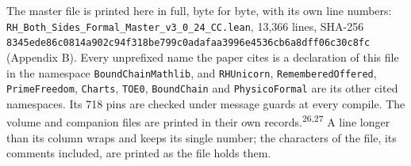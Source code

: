 \documentclass[10pt]{article}
\begin{document}
The master file is printed here in full, byte for byte, with its own
line numbers:
\texttt{RH\_\allowbreak{}Both\_\allowbreak{}Sides\_\allowbreak{}Formal\_\allowbreak{}Master\_\allowbreak{}v3\_\allowbreak{}0\_\allowbreak{}24\_\allowbreak{}CC.\allowbreak{}lean},
13,366 lines, SHA-256
\texttt{8345ede8\allowbreak{}6c0814a9\allowbreak{}02c94f31\allowbreak{}8be799c0\allowbreak{}adafaa39\allowbreak{}96e4536c\allowbreak{}b6a8dff0\allowbreak{}6c30c8fc\allowbreak{}}
(Appendix B). Every unprefixed name the paper cites is a declaration of
this file in the namespace \texttt{BoundChainMathlib}, and
\texttt{RHUnicorn}, \texttt{RememberedOffered}, \texttt{PrimeFreedom},
\texttt{Charts}, \texttt{TOE0}, \texttt{BoundChain} and
\texttt{PhysicoFormal} are its other cited namespaces. Its 718 pins are
checked under message guards at every compile. The volume and companion
files are printed in their own records.\textsuperscript{26,27} A line
longer than its column wraps and keeps its single number; the characters
of the file, its comments included, are printed as the file holds them.
\end{document}
